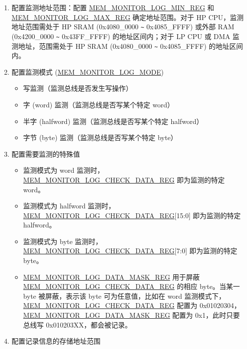 \documentclass[main\_\_CN.tex]{subfiles}
\begin{document}
\begin{enumerate}
    \item 配置监测地址范围：配置 \hyperref[regdesc:MEMMONITORLOGMINREG]{MEM\_MONITOR\_LOG\_MIN\_REG} 和 \hyperref[regdesc:MEMMONITORLOGMAXREG]{MEM\_MONITOR\_LOG\_MAX\_REG} 确定地址范围。对于 HP CPU，监测地址范围需处于 HP SRAM (0x4080\_0000 \verb+~+ 0x4085\_FFFF) 或外部 RAM (0x4200\_0000 \verb+~+ 0x43FF\_FFFF) 的地址区间内；对于 LP CPU 或 DMA 监测地址，范围需处于 HP SRAM (0x4080\_0000 \verb+~+ 0x4085\_FFFF) 的地址区间内。
    \item 配置监测模式 (\hyperref[fielddesc:MEMMONITORLOGMODE]{MEM\_MONITOR\_LOG\_MODE})
        \begin{itemize}
            \item 写监测（监测总线是否发生写操作）
            \item 字 (word) 监测（监测总线是否写某个特定 word）
            \item 半字 (halfword) 监测（监测总线是否写某个特定 halfword）
            \item 字节 (byte) 监测（监测总线是否写某个特定 byte）
        \end{itemize}
    \item 配置需要监测的特殊值
        \begin{itemize}
            \item 监测模式为 word 监测时，\hyperref[regdesc:MEMMONITORLOGCHECKDATAREG]{MEM\_MONITOR\_LOG\_CHECK\_DATA\_REG} 即为监测的特定 word。
            \item 监测模式为 halfword 监测时，\hyperref[regdesc:MEMMONITORLOGCHECKDATAREG]{MEM\_MONITOR\_LOG\_CHECK\_DATA\_REG}[15:0] 即为监测的特定 halfword。
            \item 监测模式为 byte 监测时，\hyperref[regdesc:MEMMONITORLOGCHECKDATAREG]{MEM\_MONITOR\_LOG\_CHECK\_DATA\_REG}[7:0] 即为监测的特定 byte。
            \item \hyperref[regdesc:MEMMONITORLOGDATAMASKREG]{MEM\_MONITOR\_LOG\_DATA\_MASK\_REG} 用于屏蔽 \hyperref[regdesc:MEMMONITORLOGCHECKDATAREG]{MEM\_MONITOR\_LOG\_CHECK\_DATA\_REG} 的相应 byte。当某一 byte 被屏蔽，表示该 byte 可为任意值，比如在 word 监测模式下，\hyperref[regdesc:MEMMONITORLOGCHECKDATAREG]{MEM\_MONITOR\_LOG\_CHECK\_DATA\_REG} 配置为 0x01020304，\hyperref[regdesc:MEMMONITORLOGDATAMASKREG]{MEM\_MONITOR\_LOG\_DATA\_MASK\_REG} 配置为 0x1，此时只要总线写 0x010203XX，都会被记录。
        \end{itemize}
    \item 配置记录信息的存储地址范围
        \begin{itemize}

\end{itemize}
\end{enumerate}
\end{document}
